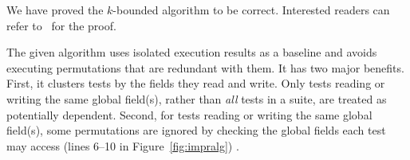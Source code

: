 We have proved the \dependenceaware{} $k$-bounded algorithm to be
correct. Interested
readers can refer to~\cite{proof-dependence-aware} for the proof.

The given algorithm uses isolated execution results as a baseline and
avoids executing permutations that are redundant with them.
%
It has two major benefits.
First, it clusters tests by the fields they
read and write. Only tests reading or writing
the same global field(s), rather than \textit{all} tests
in a suite, are treated as potentially dependent.
Second, for tests reading or writing the same global
field(s), some permutations are ignored by checking
the global fields each test may access (lines 6--10 in
Figure~\ref{fig:impralg}) . 










